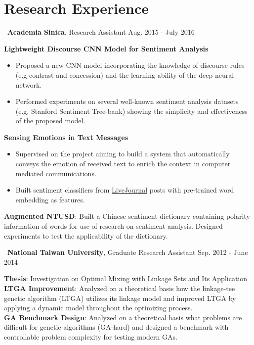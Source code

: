 \documentclass[a4paper,10pt]{article}
\begin{document}
\section{Research Experience}
\faMapMarker~\textbf{Academia Sinica}, Research Assistant \hfill Aug. 2015 - July 2016 \par
\textbf{Lightweight Discourse CNN Model for Sentiment Analysis}
\begin{itemize}
    \item Proposed a new CNN model incorporating the knowledge of discourse rules (e.g contrast and concession) and the learning ability of the deep neural network.
    \item Performed experiments on several well-known sentiment analysis datasets (e.g. Stanford Sentiment Tree-bank) showing the simplicity and effectiveness of the proposed model.
\end{itemize}
\textbf{Sensing Emotions in Text Messages}
\begin{itemize}
    \item Supervised on the project aiming to build a system that automatically conveys the emotion of received text to enrich the context in computer mediated communications.
    \item Built sentiment classifiers from \href{http://www.livejournal.com/}{LiveJournal} posts with pre-trained word embedding as features. 
\end{itemize}

\textbf{Augmented NTUSD}: Built a Chinese sentiment dictionary containing polarity information of words for use of research on sentiment analysis. Designed experiments to test the applicability of the dictionary.

\faMapMarker~\textbf{National Taiwan University}, Graduate Research Assistant \hfill Sep. 2012 - June 2014 \par
\textbf{Thesis}: Investigation on Optimal Mixing with Linkage Sets and Its Application \\
\textbf{LTGA Improvement}: Analyzed on a theoretical basis how the linkage-tee genetic algorithm (LTGA) utilizes its linkage model and improved LTGA by applying a dynamic model throughout the optimizing process. \\
\textbf{GA Benchmark Design}: Analyzed on a theoretical basis what problems are difficult for genetic algorithms (GA-hard) and designed a benchmark with controllable problem complexity for testing modern GAs.
\end{document}
